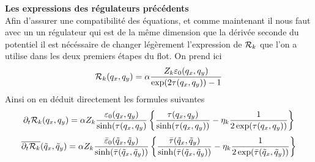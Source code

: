 \documentclass[10.5pt]{article}
\begin{document}
\vspace*{11pt}
\noindent
\textbf{Les expressions des régulateurs précédents} \\

Afin d'assurer une compatibilité des équations, et comme maintenant il nous faut avec un un régulateur qui est de la même dimension que la dérivée seconde du potentiel il est nécéssaire de changer légèrement l'expression de $\mathcal{R}_k$ que l'on a utilise dans les deux premiers étapes du flot. On prend ici
\begin{equation}
\mathcal{R}_k(q_x, q_y) = \alpha \frac{Z_k \varepsilon_0(q_x, q_y)}{\exp(2\tau(q_x, q_y)) -1}
\end{equation}
Ainsi on en déduit directement les formules suivantes
\begin{equation}
\partial_t \mathcal{R}_k(q_x, q_y) = \alpha Z_k \frac{\varepsilon_0(q_x, q_y)}{\sinh(\tau(q_x, q_y)}   \left\{ \frac{\tau(q_x, q_y)}{\sinh(\tau(q_x, q_y))} - \eta_k \frac{1}{2\exp(\tau(q_x, q_y))} \right\}
\end{equation}
\begin{equation}
\overline{\partial_t \mathcal{R}_k}(\tilde{q}_x, \tilde{q}_y) = \alpha Z_k \frac{\bar{\varepsilon}_0(\tilde{q}_x, \tilde{q}_y)}{\sinh(\bar{\tau}(\tilde{q}_x, \tilde{q}_y))}   \left\{ \frac{\bar{\tau}(\tilde{q}_x, \tilde{q}_y)}{\sinh(\bar{\tau}(\tilde{q}_x, \tilde{q}_y))} - \eta_k \frac{1}{2\exp(\bar{\tau}(\tilde{q}_x, \tilde{q}_y))} \right\}
\end{equation}
\end{document}
